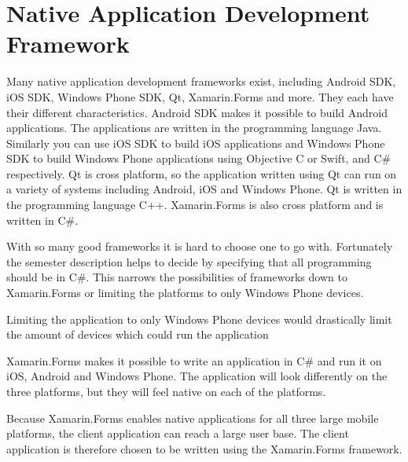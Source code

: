 \section{Native Application Development Framework}
\label{par:native_application_development_framework}

Many native application development frameworks exist, including Android SDK, iOS SDK, Windows Phone SDK, Qt, Xamarin.Forms and more. They each have their different characteristics. Android SDK makes it possible to build Android applications. The applications are written in the programming language Java. Similarly you can use iOS SDK to build iOS applications and Windows Phone SDK to build Windows Phone applications using Objective C or Swift, and C\# respectively. Qt is cross platform, so the application written using Qt can run on a variety of systems including Android, iOS and Windows Phone. Qt is written in the programming language C++. Xamarin.Forms is also cross platform and is written in C\#.

With so many good frameworks it is hard to choose one to go with. Fortunately the semester description helps to decide by specifying that all programming should be in C\#. This narrows the possibilities of frameworks down to Xamarin.Forms or limiting the platforms to only Windows Phone devices.

Limiting the application to only Windows Phone devices would drastically limit the amount of devices which could run the application

Xamarin.Forms makes it possible to write an application in C\# and run it on iOS, Android and Windows Phone. The application will look differently on the three platforms, but they will feel native on each of the platforms.

Because Xamarin.Forms enables native applications for all three large mobile platforms, the client application can reach a large user base. The client application is therefore chosen to be written using the Xamarin.Forms framework.
